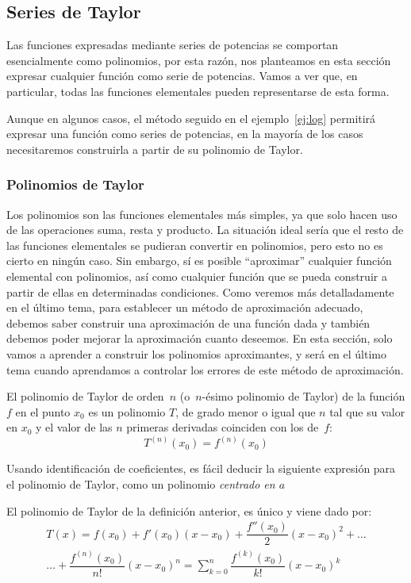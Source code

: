 \subsection{Series de Taylor}

Las funciones expresadas mediante series de potencias se comportan esencialmente como polinomios, por esta razón, nos planteamos en esta sección expresar cualquier función como serie de potencias. Vamos a ver que, en particular, todas las funciones elementales pueden representarse de esta forma.

Aunque en algunos casos, el método seguido en el ejemplo~\ref{ej:log} permitirá expresar una función como series de potencias, en la mayoría de los casos necesitaremos construirla a partir de su polinomio de Taylor.

\subsubsection{Polinomios de Taylor}

Los polinomios son las funciones elementales más simples, ya que solo hacen uso de las operaciones suma, resta y producto.
La situación ideal sería que el resto de las funciones elementales se pudieran convertir en polinomios, pero esto no es cierto en ningún caso.
Sin embargo, sí es posible ``aproximar'' cualquier función elemental con polinomios, así como cualquier función que se pueda construir a partir de ellas en determinadas condiciones.
Como veremos más detalladamente en el último tema, para establecer un método de aproximación adecuado, debemos saber construir una aproximación de una función dada y también debemos poder mejorar la aproximación cuanto deseemos.
En esta sección, solo vamos a aprender a construir los polinomios aproximantes, y será en el último tema cuando aprendamos a controlar los errores de este método de aproximación.
%
\begin{definicion}
El polinomio de Taylor de orden~$n$ (o~$n$-ésimo polinomio de Taylor) de la
función $f$ en el punto $x_0$ es un polinomio $T$, de grado
menor o igual que $n$ tal que su valor en $x_0$ y el valor de las
$n$ primeras derivadas coinciden con los de~$f$:
\[
T^{(n)}(x_0)=f^{(n)}(x_0)
\]
\end{definicion}

Usando identificación de coeficientes, es fácil deducir la siguiente expresión para el polinomio de Taylor, como un polinomio \emph{centrado en $a$}
%
\begin{corolario}
El polinomio de Taylor de la definición anterior, es único y viene dado por:
\begin{multline*}
T(x)=f(x_0)+f'(x_0)(x-x_0)+\dfrac{f''(x_0)}{2}(x-x_0)^2+\dots\\
\dots +\dfrac{f^{(n)}(x_0)}{n!}(x-x_0)^n=
\sum^n_{k=0}\dfrac{f^{(k)}(x_0)}{k!}(x-x_0)^k
\end{multline*}
\end{corolario}

